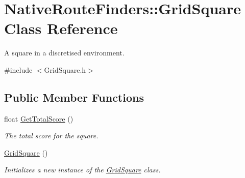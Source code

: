 \hypertarget{class_native_route_finders_1_1_grid_square}{\section{Native\-Route\-Finders\-:\-:Grid\-Square Class Reference}
\label{class_native_route_finders_1_1_grid_square}
}


A square in a discretised environment.  




{\ttfamily \#include $<$Grid\-Square.\-h$>$}

\subsection*{Public Member Functions}
\begin{DoxyCompactItemize}
\item 
float \hyperlink{class_native_route_finders_1_1_grid_square_a8b6556835f571ca26ee07f4873d0c01e}{Get\-Total\-Score} ()
\begin{DoxyCompactList}\small\item\em The total score for the square. \end{DoxyCompactList}\item 
\hyperlink{class_native_route_finders_1_1_grid_square_af4ac76d67da7aae46c33192a1ee2372a}{Grid\-Square} ()
\begin{DoxyCompactList}\small\item\em Initializes a new instance of the \hyperlink{class_native_route_finders_1_1_grid_square}{Grid\-Square} class. \end{DoxyCompactList}\end{DoxyCompactItemize}
